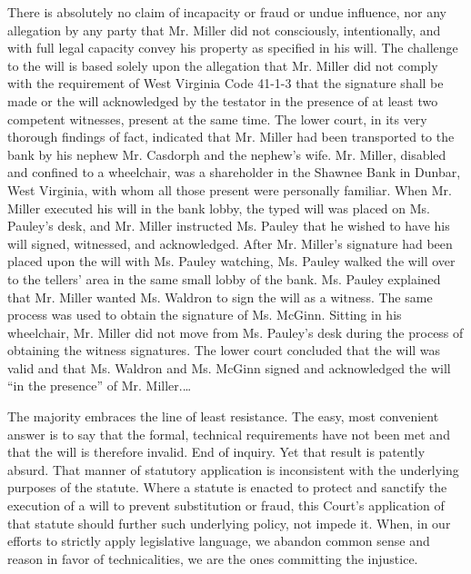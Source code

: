 There is absolutely no claim of incapacity or fraud or undue influence, nor any
allegation by any party that Mr. Miller did not consciously, intentionally, and
with full legal capacity convey his property as specified in his will. The
challenge to the will is based solely upon the allegation that Mr. Miller did
not comply with the requirement of West Virginia Code 41-1-3 that the signature
shall be made or the will acknowledged by the testator in the presence of at
least two competent witnesses, present at the same time. The lower court, in
its very thorough findings of fact, indicated that Mr. Miller had been
transported to the bank by his nephew Mr. Casdorph and the nephew's wife. Mr.
Miller, disabled and confined to a wheelchair, was a shareholder in the Shawnee
Bank in Dunbar, West Virginia, with whom all those present were personally
familiar. When Mr. Miller executed his will in the bank lobby, the typed will
was placed on Ms. Pauley's desk, and Mr. Miller instructed Ms. Pauley that he
wished to have his will signed, witnessed, and acknowledged. After Mr. Miller's
signature had been placed upon the will with Ms. Pauley watching, Ms. Pauley
walked the will over to the tellers' area in the same small lobby of the bank.
Ms. Pauley explained that Mr. Miller wanted Ms. Waldron to sign the will as a
witness. The same process was used to obtain the signature of Ms. McGinn.
Sitting in his wheelchair, Mr. Miller did not move from Ms. Pauley's desk
during the process of obtaining the witness signatures. The lower court
concluded that the will was valid and that Ms. Waldron and Ms. McGinn signed
and acknowledged the will ``in the presence'' of Mr. Miller.\ldots

The majority embraces the line of least resistance. The easy, most convenient
answer is to say that the formal, technical requirements have not been met and
that the will is therefore invalid. End of inquiry. Yet that result is patently
absurd. That manner of statutory application is inconsistent with the
underlying purposes of the statute. Where a statute is enacted to protect and
sanctify the execution of a will to prevent substitution or fraud, this Court's
application of that statute should further such underlying policy, not impede
it. When, in our efforts to strictly apply legislative language, we abandon
common sense and reason in favor of technicalities, we are the ones committing
the injustice. 


